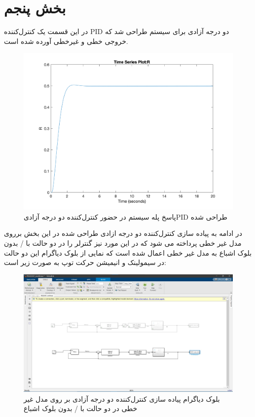 \chapter{بخش پنجم}
در این قسمت یک کنترل‌کننده PID دو درجه آزادی برای سیستم طراحی شد که خروجی خطی و غیرخطی آورده شده است.
\begin{figure}[H]
	\centering
	\includegraphics[width=12cm]{../Figure/P_V/PID2DOF.png}
	\caption{پاسخ پله سیستم در حضور کنترل‌کننده دو درجه آزادیPID طراحی شده }
\end{figure}
در ادامه به پیاده سازی کنترل‌کننده دو درجه ازادی طراحی شده در این بخش برروی مدل غیر خطی پرداخته می شود که در این مورد نیز گنترلر را در دو حالت با / بدون بلوک اشباع به مدل غیر خطی اعمال شده است که نمایی از بلوک دیاگرام این دو حالت در سیمولینک و انیمیشن حرکت توپ به صورت زیر است:
%
\begin{figure}[H]
	\centering
	\includegraphics[width=12cm]{../Figure/P_V/PID_2DOF_NONLINEAR_SIMULINK.jpg}
	\caption{بلوک دیاگرام پیاده سازی کنترل‌کننده دو درجه آزادی بر روی مدل غیر خطی در دو حالت با / بدون بلوک اشباع}
\end{figure}

